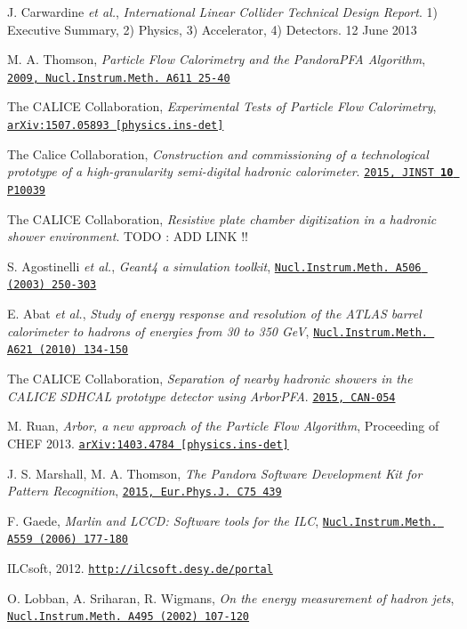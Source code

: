 \documentclass[cits]{JINST}
\begin{document}
\newpage
\begin{thebibliography}{99}

J. Carwardine {\it et al.},  \emph{International Linear Collider Technical Design Report}. 1) Executive Summary, 2) Physics, 3) Accelerator, 4) Detectors. 12 June 2013

M. A. Thomson, \emph{Particle Flow Calorimetry and the PandoraPFA Algorithm}, \href{http://dx.doi.org/10.1016/j.nima.2009.09.009}{\tt 2009, Nucl.Instrum.Meth. A611 25-40}

The CALICE Collaboration, \emph{Experimental Tests of Particle Flow Calorimetry}, \href{http://www.arxiv.org/abs/1105.3417}{\tt arXiv:1507.05893 [physics.ins-det]}

The Calice Collaboration, \emph{Construction and commissioning of a technological prototype of a high-granularity semi-digital hadronic calorimeter}. \href{http://dx.doi.org/10.1088/1748-0221/10/10/P10039}{\tt 2015, JINST \textbf{10} P10039}

The CALICE Collaboration, \emph{Resistive plate chamber digitization in a hadronic shower environment}. TODO : ADD LINK !!

S. Agostinelli \textit{et al.}, \emph{Geant4 a simulation toolkit}, \href{http://dx.doi.org/10.1016/S0168-9002(03)01368-8}{\tt Nucl.Instrum.Meth. A506 (2003) 250-303}

E. Abat \textit{et al.}, \emph{Study of energy response and resolution of the ATLAS barrel calorimeter to hadrons of energies from 30 to 350 GeV}, \href{http://dx.doi.org/10.1016/j.nima.2010.04.054}{\tt Nucl.Instrum.Meth. A621 (2010) 134-150}

The CALICE Collaboration, \emph{Separation of nearby hadronic showers in the CALICE SDHCAL prototype detector using ArborPFA}. \href{https://twiki.cern.ch/twiki/pub/CALICE/CaliceAnalysisNotes/CAN-054.pdf}{\tt 2015, CAN-054}

M. Ruan, \emph{Arbor, a new approach of the Particle Flow Algorithm}, Proceeding of CHEF 2013. \href{http://www.arxiv.org/abs/1403.4784}{\tt arXiv:1403.4784 [physics.ins-det]}

J. S. Marshall, M. A. Thomson, \emph{The Pandora Software Development Kit for Pattern Recognition}, \href{http://dx.doi.org/10.1140/epjc/s10052-015-3659-3}{\tt 2015, Eur.Phys.J. C75 439}

F. Gaede, {\it Marlin and LCCD: Software tools for the ILC}, \href{http://dx.doi.org/10.1016/j.nima.2005.11.138}{\tt Nucl.Instrum.Meth. A559 (2006) 177-180}

ILCsoft, 2012. \href{http://ilcsoft.desy.de/portal}{\tt http://ilcsoft.desy.de/portal}

O. Lobban, A. Sriharan, R. Wigmans,  \emph{On the energy measurement of hadron jets}, \href{http://dx.doi.org/10.1016/S0168-9002(02)01615-7}{\tt Nucl.Instrum.Meth. A495 (2002) 107-120}

\end{thebibliography}
\end{document}
